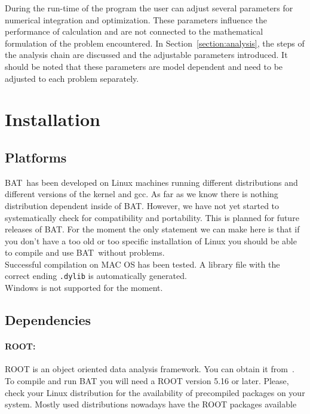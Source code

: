 \documentclass[11pt, a4paper]{article}
\newcommand{\BAT}{{\sc BAT}}
\begin{document}
\noindent 
During the run-time of the program the user can adjust several
parameters for numerical integration and optimization. These
parameters influence the performance of calculation and are not
connected to the mathematical formulation of the problem
encountered. In Section~\ref{section:analysis}, the steps of the
analysis chain are discussed and the adjustable parameters
introduced. It should be noted that these parameters are model
dependent and need to be adjusted to each problem separately. 


\pagebreak 

\section{Installation} 

\subsection{Platforms}

\BAT\ has been developed on Linux machines running different distributions
and different versions of the kernel and gcc. As far as we know there
is nothing distribution dependent inside of \BAT. However, we have not
yet started to systematically check for compatibility and
portability. This is planned for future releases of \BAT. For the
moment the only statement we can make here is that if you don't have a
too old or too specific installation of Linux you should be able to
compile and use \BAT\ without problems. \\ 

Successful compilation on  MAC OS  has been tested. A  library file
with the correct ending \texttt{.dylib} is automatically generated.\\

Windows is not supported for the moment. \\ 

\subsection{Dependencies}

\paragraph{ROOT:} 
ROOT is an object oriented data analysis framework. You can obtain it
from~\cite{ROOTweb}. To compile and run BAT you
will need a ROOT version 5.16 or later. Please, check your Linux
distribution for the availability of precompiled packages on your
system. Mostly used distributions nowadays have the ROOT packages
available
\end{document}
